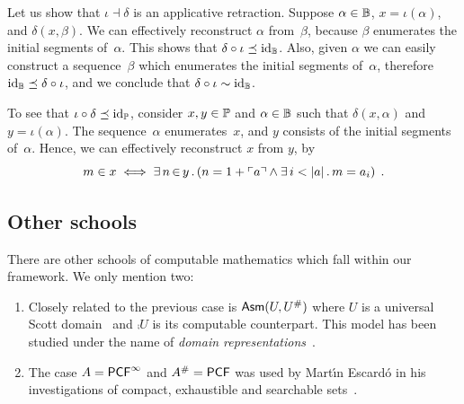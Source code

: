 Let us show that $\iota \dashv \delta$ is an applicative retraction.
Suppose $\alpha \in \mathbb{B}$, $x = \iota(\alpha)$, and $\delta(x,
\beta)$. We can effectively reconstruct $\alpha$ from~$\beta$,
because $\beta$ enumerates the initial segments of~$\alpha$. This
shows that $\delta \circ \iota \preceq \mathrm{id}_{\mathbb{B}}$. Also, given
$\alpha$ we can easily construct a sequence~$\beta$ which enumerates
the initial segments of~$\alpha$, therefore $\mathrm{id}_{\mathbb{B}} \preceq
\delta \circ \iota$, and we conclude that $\delta \circ \iota \sim
\mathrm{id}_{\mathbb{B}}$.

To see that $\iota \circ \delta \preceq \mathrm{id}_{\mathbb{P}}$, consider $x, y \in
\mathbb{P}$ and $\alpha \in \mathbb{B}$ such that $\delta(x, \alpha)$ and $y =
\iota(\alpha)$. The sequence~$\alpha$ enumerates~$x$, and $y$
consists of the initial segments of~$\alpha$. Hence, we can
effectively reconstruct $x$ from $y$, by
\begin{equation*}
  m \in x
  \iff
  \exists\, n \,{\in}\, y\,.\left(n = 1 + \ulcorner a \urcorner \land \exists\, i < |a|\,.\,m = a_i\right) \;.
\end{equation*}



\subsection{Other schools}
\label{sec:other-schools}

There are other schools of computable mathematics which fall within
our framework. We only mention two:
%
\begin{enumerate}
\item
  Closely related to the previous case is $\mathsf{Asm}(U, U^{\#})$ where
  $U$ is a universal Scott domain~\cite{GunterScott} and $\comp{U}$ is
  its computable counterpart. This model has been studied under the
  name of \emph{domain representations}~\cite{Bla97,Bla97a}.
\item
  The case $A = \mathsf{PCF}^\infty$ and $A^{\#} = \mathsf{PCF}$ was used by
  Mart{\'\i}n Escard\'o in his investigations of compact, exhaustible
  and searchable sets~\cite{Escardo}.
\end{enumerate}




